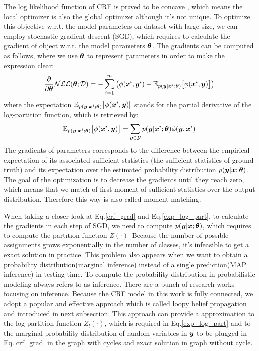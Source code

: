 The log likelihood function of CRF is proved to be concave \cite{koller2009probabilistic}, which means the local optimizer is also the global optimizer although it's not unique. To optimize this objective w.r.t. the model parameters on dataset with large size, we can employ stochastic gradient descent (SGD), which requires to calculate the gradient of object w.r.t. the model parameters $\boldsymbol \theta$. The gradients can be computed as follows, where we use $\boldsymbol \theta$ to represent parameters in order to make the expression clear:
\begin{equation}
\label{crf_grad}
\frac{\partial}{\partial \boldsymbol \theta} \mathcal{NLL}(\boldsymbol \theta; \mathcal{D}) = -\sum_{i=1}^{m}
\big(
\phi(\boldsymbol x^i, \boldsymbol y^i) - 
\mathbb{E}_{p(\boldsymbol y|\boldsymbol x^i;\boldsymbol \theta)}
\big[\phi(\boldsymbol x^i, \boldsymbol y)\big]
\big)
\end{equation}
where the expectation $\mathbb{E}_{p(\boldsymbol y|\boldsymbol x^i;\boldsymbol \theta)}
\big[\phi(\boldsymbol x^i, \boldsymbol y)\big]$ stands for the partial derivative of the log-partition function, which is retrieved by:
\begin{equation}
\label{exp_log_part}
\mathbb{E}_{p(\boldsymbol y|\boldsymbol x^i;\boldsymbol \theta)}
\big[\phi(\boldsymbol x^i, \boldsymbol y)\big] = \sum_{\boldsymbol y\in\mathcal{Y}}p(\boldsymbol y|\boldsymbol x^i;\boldsymbol \theta)\phi(\boldsymbol y, \boldsymbol x^i)
\end{equation}
The gradients of parameters corresponds to the difference between the empirical expectation of its associated sufficient statistics (the sufficient statistics of ground truth) and its expectation over the estimated probability distribution $p(\boldsymbol y|\boldsymbol x; \boldsymbol \theta)$. The goal of the optimization is to decrease the gradients until they reach zero, which means that we match of first moment of sufficient statistics over the output distribution. Therefore this way is also called moment matching.

When taking a closer look at Eq.\ref{crf_grad} and Eq.\ref{exp_log_part}, to calculate the gradients in each step of SGD, we need to compute $p(\boldsymbol y|\boldsymbol x; \boldsymbol \theta)$, which requires to compute the partition function $Z(\cdot)$. Because the number of possible assignments grows exponentially in the number of classes, it's infeasible to get a exact solution in practice. This problem also appears when we want to obtain a probability distribution(marginal inference) instead of a single prediction(MAP inference) in testing time. To compute the probability distribution in probabilistic modeling always refers to as inference. There are a bunch of research works focusing on inference. Because the CRF model in this work is fully connected, we adopt a popular and effective approach which is called loopy belief propagation and introduced in next subsection. This approach can provide a approximation to the log-partition function $Z_l(\cdot)$, which is required in Eq.\ref{exp_log_part} and to the marginal probability distribution of random variables in $\boldsymbol y$ to be plugged in Eq.\ref{crf_grad} in the graph with cycles and exact solution in graph without cycle.


